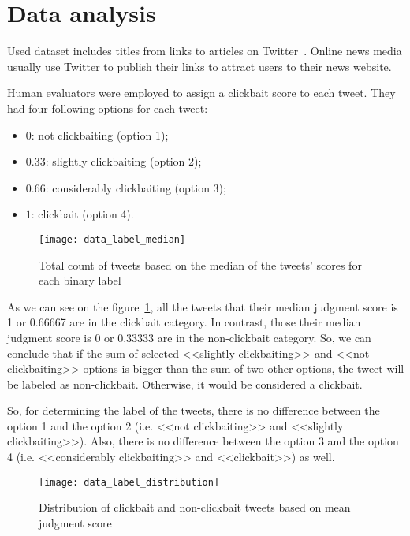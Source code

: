 \section{Data analysis}
Used dataset includes titles from links to articles on Twitter~\cite{ClickbaitDataset2016}. 
Online news media usually use Twitter to publish their links to attract users to their news website.

Human evaluators were employed to assign a clickbait score to
each tweet. They had four following options for each tweet:
\begin{itemize}
    \item $0$: not clickbaiting (option 1);
    \item $0.33$: slightly clickbaiting (option 2);
    \item $0.66$: considerably clickbaiting (option 3);
    \item $1$: clickbait (option 4).
\end{itemize}

\begin{figure}[H]
    \centering
    \texttt{[image: data\_label\_median]}
    \caption{Total count of tweets based on the median of the tweets’ scores for each binary label}
    \label{fig:data_label_median}
\end{figure}

As we can see on the figure~\ref{fig:data_label_median}, all the tweets that their median judgment score is 1 or 0.66667 are in the clickbait category. 
In contrast, those their median judgment score is 0 or 0.33333 are in
the non-clickbait category. So, we can conclude that if the sum of
selected <<slightly clickbaiting>> and <<not clickbaiting>> options is
bigger than the sum of two other options, the tweet will be labeled
as non-clickbait. Otherwise, it would be considered a clickbait.

So, for determining the label of the tweets, there is no difference
between the option 1 and the option 2 (i.e. <<not clickbaiting>> and <<slightly clickbaiting>>). Also, there is no difference between the option 3 and the option 4 (i.e. <<considerably clickbaiting>> and <<clickbait>>) as well.

\begin{figure}[H]
    \centering
    \texttt{[image: data\_label\_distribution]}
    \caption{Distribution of clickbait and non-clickbait tweets based on mean judgment score}
    \label{fig:data_label_distribution}
\end{figure}

